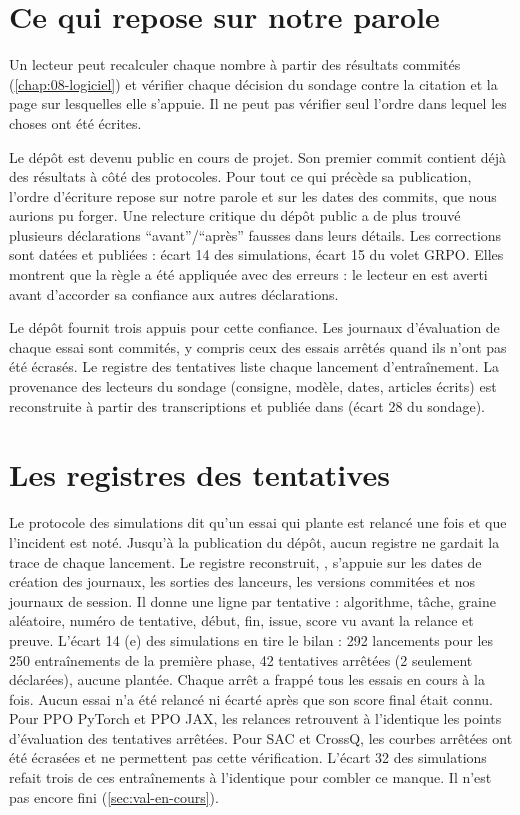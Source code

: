 \section{Ce qui repose sur notre parole}
\label{sec:parole}

Un lecteur peut recalculer chaque nombre à partir des résultats commités
(\cref{chap:08-logiciel}) et vérifier chaque décision du sondage contre la citation et la page sur
lesquelles elle s'appuie. Il ne peut pas vérifier seul l'ordre dans lequel les choses ont été
écrites.

Le dépôt est devenu public en cours de projet. Son premier commit contient
déjà des résultats à côté des protocoles. Pour tout ce qui précède sa publication, l'ordre
d'écriture repose sur notre parole et sur les dates des commits, que nous aurions pu forger.
Une relecture critique du dépôt public a de plus trouvé plusieurs déclarations
\enquote{avant}/\enquote{après} fausses dans leurs détails. Les corrections sont datées et
publiées : écart 14 des simulations, écart 15 du volet GRPO. Elles montrent que la règle a été
appliquée avec des erreurs : le lecteur en est averti avant d'accorder sa confiance aux autres
déclarations.

Le dépôt fournit trois appuis pour cette confiance. Les journaux d'évaluation de chaque essai sont
commités, y compris ceux des essais arrêtés quand ils n'ont pas été écrasés. Le registre des
tentatives liste chaque lancement d'entraînement. La provenance des lecteurs du sondage (consigne,
modèle, dates, articles écrits) est reconstruite à partir des transcriptions et publiée dans
 (écart 28 du sondage).

\section{Les registres des tentatives}
\label{sec:registres}

Le protocole des simulations dit qu'un essai qui plante est relancé une fois et que l'incident est
noté. Jusqu'à la publication du dépôt, aucun registre ne gardait la trace de chaque lancement. Le registre
reconstruit, , s'appuie sur les dates de création des
journaux, les sorties des lanceurs, les versions commitées et nos journaux de session. Il donne une
ligne par tentative : algorithme, tâche, graine aléatoire, numéro de tentative, début, fin, issue,
score vu avant la relance et preuve. L'écart 14 (e) des simulations en tire le bilan : 292
lancements pour les 250 entraînements de la première phase, 42 tentatives arrêtées (2 seulement
déclarées), aucune plantée. Chaque arrêt a frappé tous les essais en cours à la fois. Aucun essai
n'a été relancé ni écarté après que son score final était connu. Pour PPO PyTorch et PPO JAX, les
relances retrouvent à l'identique les points d'évaluation des tentatives arrêtées. Pour SAC et
CrossQ, les courbes arrêtées ont été écrasées et ne permettent pas cette vérification. L'écart 32
des simulations refait trois de ces entraînements à l'identique pour combler ce manque. Il n'est
pas encore fini (\cref{sec:val-en-cours}).

